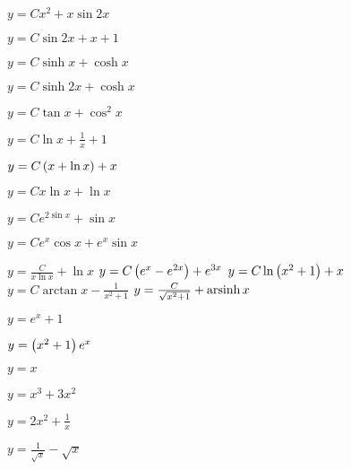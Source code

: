 \begin{enumsols}
		\item \( y = Cx^2 + x \sin{2x} \) %
		\item \( y = C \sin{2x} + x + 1 \) %
		\item \( y = C \sinh{x} + \cosh{x} \) %
		\item \( y = C \sinh{2x} + \cosh{x} \) %
		\item \( y = C \tan{x} + \cos^2{x} \) %
		\item \( y = C \ln{x} + \frac{1}{x} + 1 \) %
		\item \( y = C \left( x + \ln{x} \right) + x \) %
		\item \( y = Cx \ln{x} + \ln{x} \) %
		\item \( y = Ce^{2 \sin{x}} + \sin{x} \) %
		\item \( y = Ce^{x} \cos{x} + e^{x} \sin{x} \) %
		\item \( y = \frac{C}{x \ln{x}} + \ln{x} \) %
		\itemstar \( y = C \left( e^{x} - e^{2x} \right) + e^{3x} \) %
		\itemstar \( y = C \ln\left( x^2 + 1 \right) + x \) %
		\itemstar \( y = C \arctan{x} - \frac{1}{x^2 + 1} \) %
		\itemstar \( y = \frac{C}{\sqrt{x^2 + 1}} + \operatorname{arsinh}{x} \) %

		\label{sol:firstorder:linear_cauchy}

		\item \( y = e^{x} + 1 \) %
		\item \( y = \left( x^2 + 1 \right) e^{x} \) %
		\item \( y = x \) %
		\item \( y = x^3 + 3x^2 \) %
		\item \( y = 2x^2 + \frac{1}{x} \) %
		\item \( y = \frac{1}{\sqrt{x}} - \sqrt{x} \) %


\end{enumsols}
